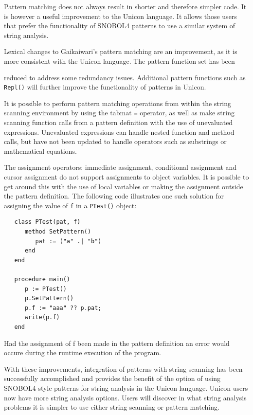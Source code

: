 \documentclass{article}
\begin{document}
Pattern matching does not always result in shorter and therefore simpler code.  It is however a useful improvement to the Unicon language.  It allows those users that prefer the functionality of SNOBOL4 patterns to use a similar system of string analysis.

Lexical changes to Gaikaiwari's pattern matching are an improvement, as it is more consistent with the Unicon language.  The pattern function set has been 

\pagebreak \noindent
reduced to address some redundancy issues.  Additional pattern functions such as \texttt{Repl()} will further improve the functionality of patterns in Unicon.

It is possible to perform pattern matching operations from within the string scanning environment by using the tabmat \texttt{=} operator, as well as make string scanning function calls from a pattern definition with the use of unevaluated expressions.  Unevaluated expressions can handle nested function and method calls, but have not been updated to handle operators such as substrings or mathematical equations. 

The assignment operators: immediate assignment, conditional assignment and cursor assignment do not support assignments to object variables.  It is possible to get around this with the use of local variables or making the assignment outside the pattern definition.  The following code illustrates one such solution for assigning the value of \texttt{f} in a \texttt{PTest()} object: \\
\begin{verbatim}
   class PTest(pat, f)
      method SetPattern()
         pat := ("a" .| "b")
      end
   end

   procedure main()
      p := PTest()
      p.SetPattern()
      p.f := "aaa" ?? p.pat;
      write(p.f)
   end
\end{verbatim}
\noindent Had the assignment of f been made in the pattern definition an error would occure during the runtime execution of the program. 

\pagebreak
With these improvements, integration of patterns with string scanning has been successfully accomplished and provides the benefit of the option of using \linebreak SNOBOL4 style patterns for string analysis in the Unicon language.  Unicon users now have more string analysis options.  Users will discover in what string analysis problems it is simpler to use either string scanning or pattern matching.
\end{document}
